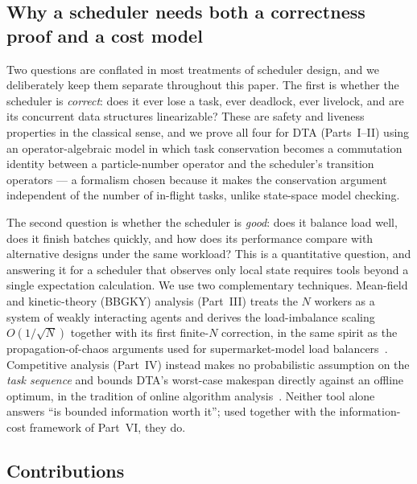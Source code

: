 \documentclass[11pt,a4paper]{article}
\begin{document}
\subsection*{Why a scheduler needs both a correctness proof and a cost model}

Two questions are conflated in most treatments of scheduler design, and we
deliberately keep them separate throughout this paper. The first is
whether the scheduler is \emph{correct}: does it ever lose a task, ever
deadlock, ever livelock, and are its concurrent data structures
linearizable? These are safety and liveness properties in the classical
sense, and we prove all four for DTA (Parts~I--II) using an
operator-algebraic model in which task conservation becomes a commutation
identity between a particle-number operator and the scheduler's
transition operators --- a formalism chosen because it makes the
conservation argument independent of the number of in-flight tasks, unlike
state-space model checking.

The second question is whether the scheduler is \emph{good}: does it
balance load well, does it finish batches quickly, and how does its
performance compare with alternative designs under the same workload?
This is a quantitative question, and answering it for a scheduler that
observes only local state requires tools beyond a single expectation
calculation. We use two complementary techniques. Mean-field and
kinetic-theory (BBGKY) analysis (Part~III) treats the $N$ workers as a
system of weakly interacting agents and derives the load-imbalance scaling
$O(1/\sqrt{N})$ together with its first finite-$N$ correction, in the same
spirit as the propagation-of-chaos arguments used for supermarket-model
load balancers~\cite{mitzenmacher2001,vvedenskaya1996}. Competitive
analysis (Part~IV) instead makes no probabilistic assumption on the
\emph{task sequence} and
bounds DTA's worst-case makespan directly against an offline optimum,
in the tradition of online algorithm analysis~\cite{borodin_elyaniv1998}.
Neither tool alone answers ``is bounded information worth it''; used
together with the information-cost framework of Part~VI, they do.

\subsection*{Contributions}
\end{document}
